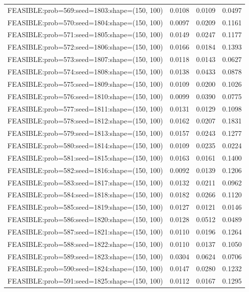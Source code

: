 \begin{longtable}{lccc}
FEASIBLE:prob=569:seed=1803:shape=(150, 100) & 0.0108 & 0.0109 & 0.0497 \\
FEASIBLE:prob=570:seed=1804:shape=(150, 100) & 0.0097 & 0.0209 & 0.1161 \\
FEASIBLE:prob=571:seed=1805:shape=(150, 100) & 0.0149 & 0.0247 & 0.1177 \\
FEASIBLE:prob=572:seed=1806:shape=(150, 100) & 0.0166 & 0.0184 & 0.1393 \\
FEASIBLE:prob=573:seed=1807:shape=(150, 100) & 0.0118 & 0.0143 & 0.0627 \\
FEASIBLE:prob=574:seed=1808:shape=(150, 100) & 0.0138 & 0.0433 & 0.0878 \\
FEASIBLE:prob=575:seed=1809:shape=(150, 100) & 0.0109 & 0.0200 & 0.1026 \\
FEASIBLE:prob=576:seed=1810:shape=(150, 100) & 0.0099 & 0.0390 & 0.0775 \\
FEASIBLE:prob=577:seed=1811:shape=(150, 100) & 0.0131 & 0.0129 & 0.1098 \\
FEASIBLE:prob=578:seed=1812:shape=(150, 100) & 0.0162 & 0.0207 & 0.1831 \\
FEASIBLE:prob=579:seed=1813:shape=(150, 100) & 0.0157 & 0.0243 & 0.1277 \\
FEASIBLE:prob=580:seed=1814:shape=(150, 100) & 0.0109 & 0.0235 & 0.0224 \\
FEASIBLE:prob=581:seed=1815:shape=(150, 100) & 0.0163 & 0.0161 & 0.1400 \\
FEASIBLE:prob=582:seed=1816:shape=(150, 100) & 0.0092 & 0.0139 & 0.1206 \\
FEASIBLE:prob=583:seed=1817:shape=(150, 100) & 0.0132 & 0.0211 & 0.0962 \\
FEASIBLE:prob=584:seed=1818:shape=(150, 100) & 0.0182 & 0.0266 & 0.1120 \\
FEASIBLE:prob=585:seed=1819:shape=(150, 100) & 0.0127 & 0.0121 & 0.0146 \\
FEASIBLE:prob=586:seed=1820:shape=(150, 100) & 0.0128 & 0.0512 & 0.0489 \\
FEASIBLE:prob=587:seed=1821:shape=(150, 100) & 0.0110 & 0.0196 & 0.1264 \\
FEASIBLE:prob=588:seed=1822:shape=(150, 100) & 0.0110 & 0.0137 & 0.1050 \\
FEASIBLE:prob=589:seed=1823:shape=(150, 100) & 0.0304 & 0.0624 & 0.0706 \\
FEASIBLE:prob=590:seed=1824:shape=(150, 100) & 0.0147 & 0.0280 & 0.1232 \\
FEASIBLE:prob=591:seed=1825:shape=(150, 100) & 0.0112 & 0.0167 & 0.1295 \\

\end{longtable}
